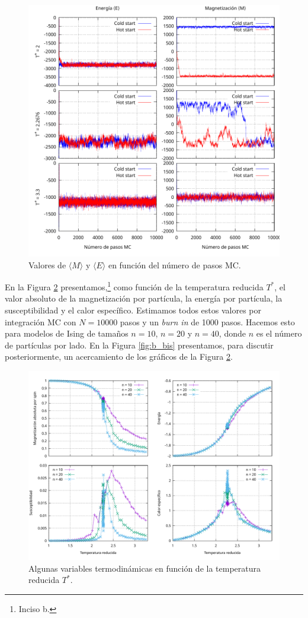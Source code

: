 \documentclass[a4paper,12pt]{article}
\begin{document}
\begin{figure}[h!]
    \centering
    \includegraphics[width = \textwidth]{../img/a.pdf}
    \caption{Valores de $\langle M \rangle$ y $\langle E \rangle$ en función del número de pasos MC.}
    \label{fig:a}
\end{figure}

En la Figura \ref{fig:b} presentamos,\footnote{Inciso b.} como función de la temperatura reducida $T^*$, el valor absoluto de la magnetización por partícula, la energía por partícula, la susceptibilidad y el calor específico. Estimamos todos estos valores por integración MC con $N = 10000$ pasos y un {\it burn in} de 1000 pasos. Hacemos esto para modelos de Ising de tamaños $n = 10$, $n = 20$ y $n = 40$, donde $n$ es el número de partículas por lado. En la Figura \ref{fig:b_bis} presentamos, para discutir posteriormente, un acercamiento de los gráficos de la Figura \ref{fig:b}.

\begin{figure}[h!]
    \centering
    \includegraphics[width = .9\textwidth]{../img/b.pdf}
    \caption{Algunas variables termodinámicas en función de la temperatura reducida $T^*$.}
    \label{fig:b}
\end{figure}
\end{document}
